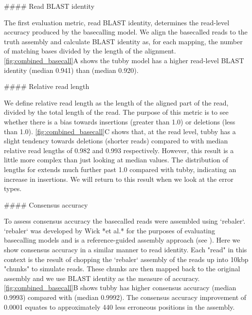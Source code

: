 \begin{markdown}
#### Read BLAST identity

The first evaluation metric, read BLAST identity, determines the read-level accuracy produced by the basecalling model. We align the basecalled reads to the truth assembly and calculate BLAST identity as, for each mapping, the number of matching bases divided by the length of the alignment. \autoref{fig:combined_basecall}A shows the tubby model has a higher read-level BLAST identity (median 0.941) than \guppy{} (median 0.920).

#### Relative read length

We define relative read length as the length of the aligned part of the read, divided by the total length of the read. The purpose of this metric is to see whether there is a bias towards insertions (greater than 1.0) or deletions (less than 1.0). \autoref{fig:combined_basecall}C shows that, at the read level, tubby has a slight tendency towards deletions (shorter reads) compared to \guppy{} with median relative read lengths of 0.982 and 0.993 respectively. However, this result is a little more complex than just looking at median values. The distribution of lengths for \guppy{} extends much further past 1.0 compared with tubby, indicating an increase in insertions. We will return to this result when we look at the error types.

#### Consensus accuracy

To assess consensus accuracy the basecalled reads were assembled using `rebaler`. `rebaler` was developed by Wick *et al.* for the purposes of evaluating basecalling models and is a reference-guided assembly approach (see ). Here we show consensus accuracy in a similar manner to read identity. Each "read" in this context is the result of chopping the `rebaler` assembly of the reads up into 10kbp "chunks" to simulate reads. These chunks are then mapped back to the original assembly and we use BLAST identity as the measure of accuracy. \autoref{fig:combined_basecall}B shows tubby has higher consensus accuracy (median 0.9993) compared with \guppy{} (median 0.9992). The consensus accuracy improvement of 0.0001 equates to approximately 440 less erroneous positions in the \mtb{} assembly.

\end{markdown}


